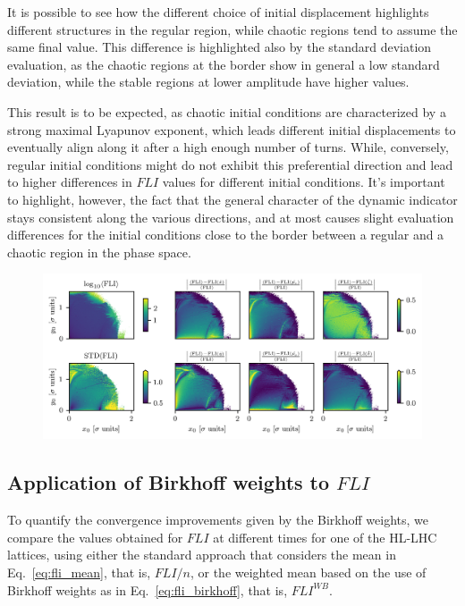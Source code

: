It is possible to see how the different choice of initial displacement highlights different structures in the regular region, while chaotic regions tend to assume the same final value. This difference is highlighted also by the standard deviation evaluation, as the chaotic regions at the border show in general a low standard deviation, while the stable regions at lower amplitude have higher values.

This result is to be expected, as chaotic initial conditions are characterized by a strong maximal Lyapunov exponent, which leads different initial displacements to eventually align along it after a high enough number of turns. While, conversely, regular initial conditions might do not exhibit this preferential direction and lead to higher differences in $FLI$ values for different initial conditions. It's important to highlight, however, the fact that the general character of the dynamic indicator stays consistent along the various directions, and at most causes slight evaluation differences for the initial conditions close to the border between a regular and a chaotic region in the phase space.

\begin{figure}[htp]
    \centering
    \includegraphics[width=1.0\textwidth]{6_lhc_dynamic_indicators/figs/fli_mean_std.png}
    \caption{}
    \label{fig:fli_compare}
\end{figure}

\subsection{Application of Birkhoff weights to $FLI$}

To quantify the convergence improvements given by the Birkhoff weights, we compare the values obtained for $FLI$ at different times for one of the HL-LHC lattices, using either the standard approach that considers the mean in Eq.~\eqref{eq:fli_mean}, that is, $FLI/n$, or the weighted mean based on the use of Birkhoff weights as in Eq.~\eqref{eq:fli_birkhoff}, that is, $FLI^{WB}$.

